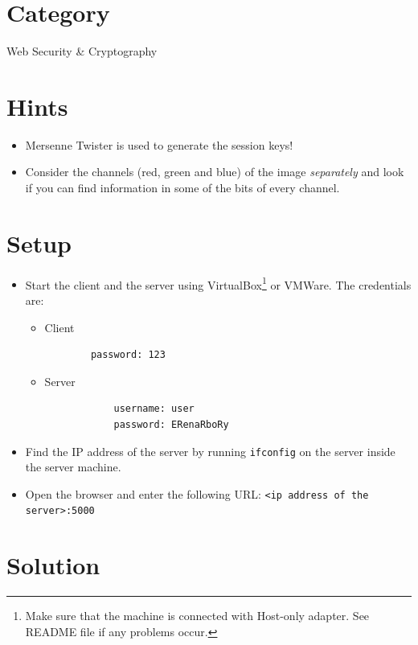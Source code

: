 \documentclass[11pt]{article}
\begin{document}
\section{Category}
Web Security \& Cryptography

\section{Hints}
\begin{itemize}
\item Mersenne Twister is used to generate the session keys!
\item Consider the channels (red, green and blue) of the image \textit{separately} and look if you can find information in some of the bits of every channel. 
\end{itemize}

\section{Setup}
\begin{itemize}
\item Start the client and the server using VirtualBox\footnote{Make sure that the machine is connected with Host-only adapter. See README file if any problems occur.} or VMWare. The credentials are:
\begin{itemize}
	\item Client
	\begin{verbatim}
		password: 123
	\end{verbatim}
	\item Server
		\begin{verbatim}
			username: user
			password: ERenaRboRy
		\end{verbatim}
\end{itemize}
\item Find the IP address of the server by running \texttt{ifconfig} on the server inside the server machine.
\item Open the browser and enter the following URL: \texttt{<ip address of the server>:5000}
\end{itemize}


\section{Solution}
\end{document}
